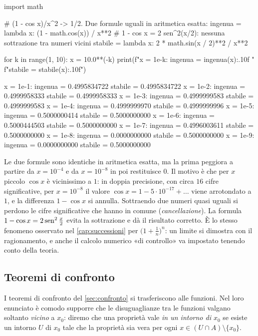\begin{python}
import math

# (1 - cos x)/x^2 -> 1/2. Due formule uguali in aritmetica esatta:
ingenua = lambda x: (1 - math.cos(x)) / x**2
# 1 - cos x = 2 sen^2(x/2): nessuna sottrazione tra numeri vicini
stabile = lambda x: 2 * math.sin(x / 2)**2 / x**2

for k in range(1, 10):
    x = 10.0**(-k)
    print(f"x = 1e-{k}:   ingenua = {ingenua(x):.10f}   "
          f"stabile = {stabile(x):.10f}")
\end{python}
\begin{risultato}
x = 1e-1:   ingenua = 0.4995834722   stabile = 0.4995834722
x = 1e-2:   ingenua = 0.4999958333   stabile = 0.4999958333
x = 1e-3:   ingenua = 0.4999999583   stabile = 0.4999999583
x = 1e-4:   ingenua = 0.4999999970   stabile = 0.4999999996
x = 1e-5:   ingenua = 0.5000000414   stabile = 0.5000000000
x = 1e-6:   ingenua = 0.5000444503   stabile = 0.5000000000
x = 1e-7:   ingenua = 0.4996003611   stabile = 0.5000000000
x = 1e-8:   ingenua = 0.0000000000   stabile = 0.5000000000
x = 1e-9:   ingenua = 0.0000000000   stabile = 0.5000000000
\end{risultato}

\begin{attenzione}
Le due formule sono identiche in aritmetica esatta, ma la prima peggiora a partire da
$x=10^{-4}$ e da $x=10^{-8}$ in poi restituisce $0$. Il motivo è che per $x$ piccolo
$\cos x$ è vicinissimo a $1$: in doppia precisione, con circa $16$ cifre significative,
per $x=10^{-8}$ il valore $\cos x=1-5\cdot10^{-17}+\dots$ viene arrotondato a $1$, e la
differenza $1-\cos x$ si annulla. Sottraendo due numeri quasi uguali si perdono le cifre
significative che hanno in comune (\emph{cancellazione}). La formula
$1-\cos x=2\operatorname{sen}^{2}\frac x2$ evita la sottrazione e dà il risultato corretto. È lo
stesso fenomeno osservato nel \cref{cap:successioni} per $\bigl(1+\frac1n\bigr)^{n}$: un
limite si dimostra con il ragionamento, e anche il calcolo numerico «di controllo» va
impostato tenendo conto della teoria.
\end{attenzione}

\subsection{Teoremi di confronto}

I teoremi di confronto del \cref{sec:confronto} si trasferiscono alle funzioni. Nel loro
enunciato è comodo supporre che le disuguaglianze tra le funzioni valgano soltanto
\emph{vicino} a $x_{0}$: diremo che una proprietà vale \emph{in un intorno di $x_{0}$}
se esiste un intorno $U$ di $x_{0}$ tale che la proprietà sia vera per ogni
$x\in(U\cap A)\setminus\{x_{0}\}$.

